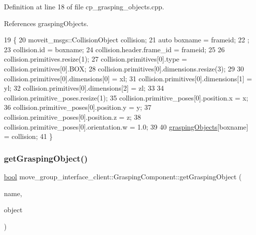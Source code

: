 Definition at line 18 of file cp\+\_\+grasping\+\_\+objects.\+cpp.



References grasping\+Objects.


\begin{DoxyCode}
19    \{
20       moveit\_msgs::CollisionObject collision;
21       \textcolor{keyword}{auto} boxname = frameid;
22       ;
23       collision.id = boxname;
24       collision.header.frame\_id = frameid;
25 
26       collision.primitives.resize(1);
27       collision.primitives[0].type = collision.primitives[0].BOX;
28       collision.primitives[0].dimensions.resize(3);
29 
30       collision.primitives[0].dimensions[0] = xl;
31       collision.primitives[0].dimensions[1] = yl;
32       collision.primitives[0].dimensions[2] = zl;
33 
34       collision.primitive\_poses.resize(1);
35       collision.primitive\_poses[0].position.x = x;
36       collision.primitive\_poses[0].position.y = y;
37       collision.primitive\_poses[0].position.z = z;
38       collision.primitive\_poses[0].orientation.w = 1.0;
39 
40       \hyperlink{classmove__group__interface__client_1_1GraspingComponent_aeed40e6ade0536714390acd6a8a2a366}{graspingObjects}[boxname] = collision;
41    \}
\end{DoxyCode}
\mbox{\label{classmove__group__interface__client_1_1GraspingComponent_ad3b8583ead160cf3fca89809c9880f1e}} 
\subsubsection{\texorpdfstring{get\+Grasping\+Object()}{getGraspingObject()}}
{\footnotesize\ttfamily \hyperlink{classbool}{bool} move\+\_\+group\+\_\+interface\+\_\+client\+::\+Grasping\+Component\+::get\+Grasping\+Object (\begin{DoxyParamCaption}\item[{std\+::string}]{name,  }\item[{moveit\+\_\+msgs\+::\+Collision\+Object \&}]{object }\end{DoxyParamCaption})}



